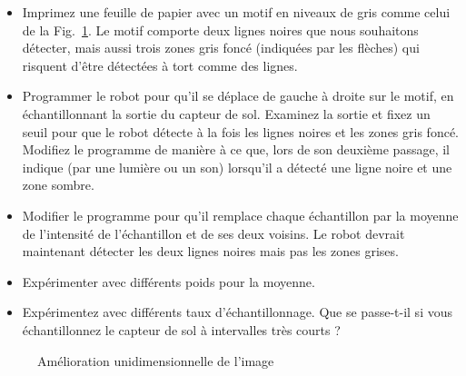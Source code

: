 \begin{framed}
\begin{itemize}
\item Imprimez une feuille de papier avec un motif en niveaux de gris comme celui de la Fig.~\ref{fig.one-enhance}. Le motif comporte deux lignes noires que nous souhaitons détecter, mais aussi trois zones gris foncé (indiquées par les flèches) qui risquent d'être détectées à tort comme des lignes.
\item Programmer le robot pour qu'il se déplace de gauche à droite sur le motif, en échantillonnant la sortie du capteur de sol. Examinez la sortie et fixez un seuil pour que le robot détecte à la fois les lignes noires et les zones gris foncé. Modifiez le programme de manière à ce que, lors de son deuxième passage, il indique (par une lumière ou un son) lorsqu'il a détecté une ligne noire et une zone sombre.
\item Modifier le programme pour qu'il remplace chaque échantillon par la moyenne de l'intensité de l'échantillon et de ses deux voisins. Le robot devrait maintenant détecter les deux lignes noires mais pas les zones grises.
\item Expérimenter avec différents poids pour la moyenne.
\item Expérimentez avec différents taux d'échantillonnage. Que se passe-t-il si vous échantillonnez le capteur de sol à intervalles très courts ?
\end{itemize}
\end{framed}

\begin{figure}
\begin{center}
\caption{Amélioration unidimensionnelle de l'image}\label{fig.one-enhance}
\end{center}
\end{figure}

